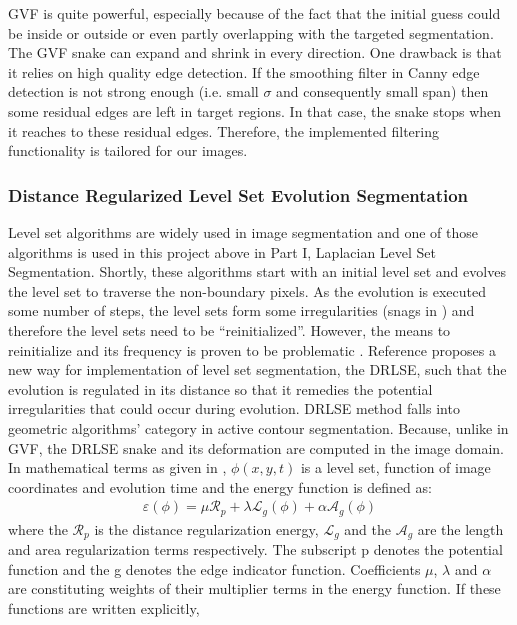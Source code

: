\documentclass{article}
\begin{document}
GVF is quite powerful, especially because of the fact that the initial guess could be inside or outside or even partly overlapping with the targeted segmentation. The GVF snake can expand and shrink in every direction. One drawback is that it relies on high quality edge detection. If the smoothing filter in Canny edge detection is not strong enough (i.e. small $\sigma$ and consequently small span) then some residual edges are left in target regions. In that case, the snake stops when it reaches to these residual edges. Therefore, the implemented filtering functionality is tailored for our images.

\subsubsection*{Distance Regularized Level Set Evolution Segmentation}
Level set algorithms are widely used in image segmentation and one of those algorithms is used in this project above in Part I, Laplacian Level Set Segmentation. Shortly, these algorithms start with an initial level set and evolves the level set to traverse the non-boundary pixels. As the evolution is executed some number of steps, the level sets form some irregularities (snags in \cite{hieber}) and therefore the level sets need to be ``reinitialized''. However, the means to reinitialize and its frequency is proven to be problematic \cite{drlse}. Reference \cite{drlse} proposes a new way for implementation of level set segmentation, the DRLSE, such that the evolution is regulated in its distance so that it remedies the potential irregularities that could occur during evolution. DRLSE method falls into geometric algorithms' category in active contour segmentation. Because, unlike in GVF, the DRLSE snake and its deformation are computed in the image domain. In mathematical terms as given in \cite{drlse}, $\phi(x,y,t)$ is a level set, function of image coordinates and evolution time and the energy function is defined as:
\begin{align*}
\varepsilon(\phi) = \mu \mathcal{R}_p + \lambda \mathcal{L}_g (\phi)+\alpha \mathcal{A}_g (\phi)
\end{align*}
where the $\mathcal{R}_p$ is the distance regularization energy, $\mathcal{L}_g$ and the $ \mathcal{A}_g$ are the length and area regularization terms respectively. The subscript p denotes the potential function and the g denotes the edge indicator function. Coefficients $\mu$, $\lambda$ and $\alpha$ are constituting weights of their multiplier terms in the energy function. If these functions are written explicitly,
\end{document}
